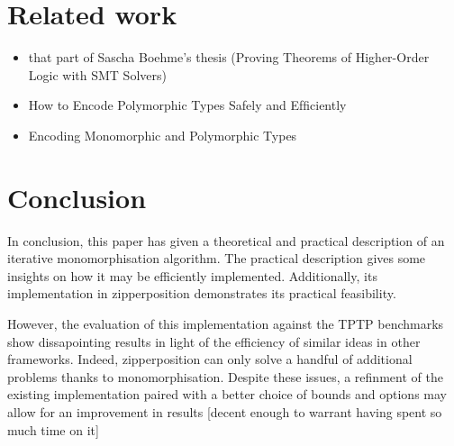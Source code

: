 \documentclass{article}
\begin{document}
\section{Related work}

\begin{itemize}
    \item that part of Sascha Boehme's thesis (Proving Theorems of Higher-Order Logic with SMT Solvers)
    \item How to Encode Polymorphic Types Safely and Efﬁciently
    \item Encoding Monomorphic and Polymorphic Types
\end{itemize}

\section{Conclusion}

In conclusion, this paper has given a theoretical and practical description of an iterative monomorphisation algorithm. The practical description gives some insights on how it may be efficiently implemented. Additionally, its implementation in zipperposition demonstrates its practical feasibility.

However, the evaluation of this implementation against the TPTP benchmarks show dissapointing results in light of the efficiency of similar ideas in other frameworks. Indeed, zipperposition can only solve a handful of additional problems thanks to monomorphisation. Despite these issues, a refinment of the existing implementation paired with a better choice of bounds and options may allow for an improvement in results [decent enough to warrant having spent so much time on it]

\end{document}
